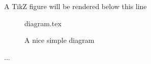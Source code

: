 \documentclass[float=false, crop=false]{standalone}
\begin{document}
A TikZ figure will be rendered below this line
 
\begin{figure}[ht]
 
{diagram.tex}
 
\label{fig:tikzexample}
\caption{A nice simple diagram}
\end{figure}
 
...
\end{document}
